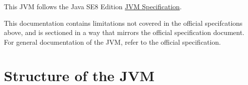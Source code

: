 
\usepackage{titlesec}

\setcounter{secnumdepth}{4}

\newcommand{\Rule}[2]{\genfrac{}{}{0.7pt}{}{{\setlength{\fboxrule}{0pt}\setlength{\fboxsep}{3mm}\fbox{$#1$}}}{{\setlength{\fboxrule}{0pt}\setlength{\fboxsep}{3mm}\fbox{$#2$}}}}

\newcommand{\TruE}{\textbf{\texttt{true}}}
\newcommand{\FalsE}{\textbf{\texttt{false}}}
\newcommand{\AndOp}{\texttt{\&\&}}
\newcommand{\OrOp}{\texttt{||}}
\newcommand{\ThenOp}{\texttt{?}}
\newcommand{\ElseOp}{\texttt{:}}
\newcommand{\Rc}{\texttt{\}}}
\newcommand{\Lc}{\texttt{\{}}
\newcommand{\Rp}{\texttt{)}}
\newcommand{\Lp}{\texttt{(}}
\newcommand{\Fun}{\textbf{\texttt{function}}}
\newcommand{\Let}{\textbf{\texttt{let}}}
\newcommand{\Return}{\textbf{\texttt{return}}}
\newcommand{\Const}{\textbf{\texttt{const}}}
\newcommand{\If}{\textbf{\texttt{if}}}
\newcommand{\Else}{\textbf{\texttt{else}}}
\newcommand{\Bool}{\texttt{boolean}}
\newcommand{\Number}{\texttt{number}}
\newcommand{\String}{\texttt{string}}
\newcommand{\Undefined}{\texttt{undefined}}
\newcommand{\Null}{\texttt{null}}
\newcommand{\Any}{\texttt{any}}
\newcommand{\Void}{\texttt{void}}
\newcommand{\Pred}{\textit{Pred}}
\newcommand{\type}{\textit{type}}
\newcommand{\polytype}{\textit{polytype}}
\newcommand{\predtype}{\textit{predtype}}
\newcommand{\ExtractPos}{\ensuremath{\textit{Extract}^+}}
\newcommand{\ExtractNeg}{\ensuremath{\textit{Extract}^-}}





This JVM follows the Java SE8 Edition \href{https://docs.oracle.com/javase/specs/jvms/se8/html/index.html}{JVM Specification}.

This documentation contains limitations not covered in the official specifcations above, and is sectioned
in a way that mirrors the official specification document. For general documentation of the JVM, refer to the official specification.


\section{Structure of the JVM}

\addtocounter{subsection}{7}
